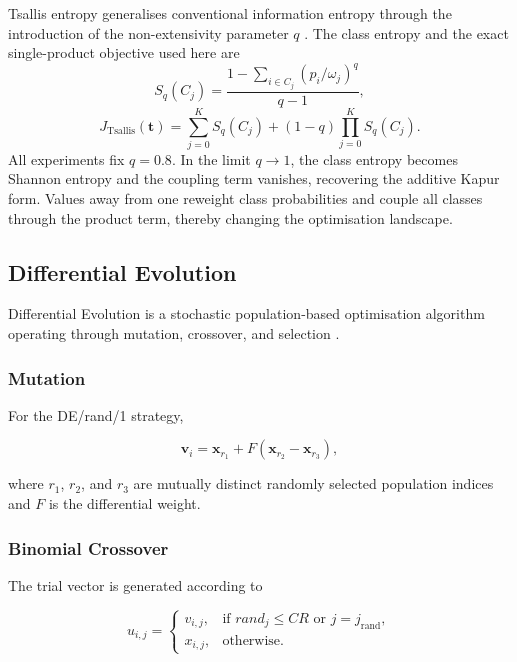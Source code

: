 \documentclass[review]{elsarticle}
\begin{document}
Tsallis entropy generalises conventional information entropy through
the introduction of the non-extensivity parameter $q$
\citep{tsallis1988generalization}. The class entropy and the exact
single-product objective used here are
\begin{equation}
S_q(C_j)=\frac{1-\sum_{i\in C_j}(p_i/\omega_j)^q}{q-1},
\end{equation}
\begin{equation}
J_{\mathrm{Tsallis}}(\mathbf{t})=
\sum_{j=0}^{K}S_q(C_j)+(1-q)\prod_{j=0}^{K}S_q(C_j).
\end{equation}
All experiments fix $q=0.8$. In the limit $q\rightarrow1$, the class
entropy becomes Shannon entropy and the coupling term vanishes, recovering
the additive Kapur form. Values away from one reweight class probabilities
and couple all classes through the product term, thereby changing the
optimisation landscape.


\subsection{Differential Evolution}
\label{sec:de_background}

Differential Evolution is a stochastic population-based optimisation
algorithm operating through mutation, crossover, and selection
\citep{storn1997differential}.

\subsubsection{Mutation}

For the DE/rand/1 strategy,

\begin{equation}
\mathbf{v}_{i}
=
\mathbf{x}_{r_1}
+
F
\left(
\mathbf{x}_{r_2}
-
\mathbf{x}_{r_3}
\right),
\end{equation}

where $r_1$, $r_2$, and $r_3$ are mutually distinct randomly selected
population indices and $F$ is the differential weight.


\subsubsection{Binomial Crossover}

The trial vector is generated according to

\begin{equation}
u_{i,j}
=
\begin{cases}
v_{i,j},
& \text{if } rand_j \leq CR
\text{ or } j=j_{\mathrm{rand}}, \\

x_{i,j},
& \text{otherwise}.
\end{cases}
\end{equation}
\end{document}
